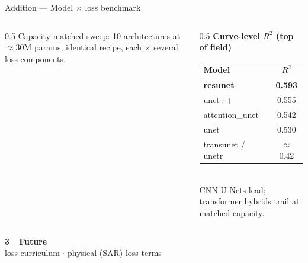 \documentclass[aspectratio=169,10pt]{beamer}
\begin{document}
\begin{frame}{Addition --- Model $\times$ loss benchmark}
  \begin{columns}[T]
    \begin{column}{0.5\textwidth}
      \small
      Capacity-matched sweep: 10 architectures at $\approx\!30$M params, identical recipe,
      each $\times$ several loss components.
      \begin{center}
      \end{center}
    \end{column}
    \begin{column}{0.5\textwidth}
      \centering \scriptsize
      \textbf{Curve-level $R^2$ (top of field)}\\[2pt]
      \begin{tabular}{lc}
        \toprule
        Model & $R^2$ \\
        \midrule
        \textbf{resunet} & \textbf{0.593} \\
        unet++           & 0.555 \\
        attention\_unet  & 0.542 \\
        unet             & 0.530 \\
        transunet / unetr& $\approx$0.42 \\
        \bottomrule
      \end{tabular}
      \\[3pt]
      CNN U-Nets lead; transformer hybrids trail at matched capacity.
    \end{column}
  \end{columns}
\end{frame}

\begin{frame}[plain]
  \centering \vfill
  {\Large\bfseries\color{accent} 3\ \ Future}\\[4pt]
  {\small loss curriculum \; $\cdot$ \; physical (SAR) loss terms}
  \vfill
\end{frame}
\end{document}
